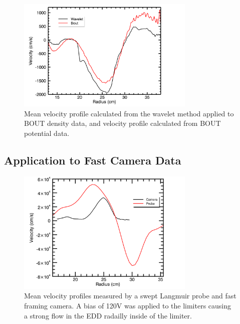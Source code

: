 \documentclass{jpp}
\begin{document}
\begin{figure}
\centerline{\includegraphics[width=8.5cm]{plot_bout_wavelet_vel}}
\caption{Mean velocity profile calculated from the wavelet method applied to BOUT density data, and velocity profile calculated from BOUT potential data.}
\label{fig:plot_bout_wavelet_vel}
\end{figure}


\subsection{Application to Fast Camera Data}

\begin{figure}
\centerline{\includegraphics[width=8.5cm]{plot_Velocity_cam_probe_bias_120V}}
\caption{ Mean velocity profiles measured by a swept Langmuir probe and fast framing camera.  A bias of 120V was applied to the limiters causing a strong flow in the EDD radailly inside of the limiter.}
\label{fig:plot_Velocity_cam_probe_bias_120V}
\end{figure}
\end{document}
